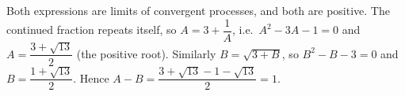 Both expressions are limits of convergent processes, and both are positive. The continued fraction repeats itself, so $A=3+\dfrac{1}{A}$, i.e.\ $A^2-3A-1=0$ and $A=\dfrac{3+\sqrt{13}}{2}$ (the positive root). Similarly $B=\sqrt{3+B}$, so $B^2-B-3=0$ and $B=\dfrac{1+\sqrt{13}}{2}$. Hence $A-B=\dfrac{3+\sqrt{13}-1-\sqrt{13}}{2}=\boxed{1}$.

